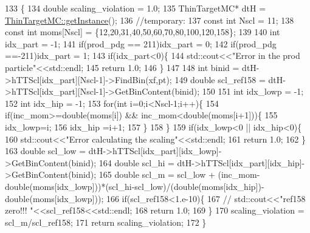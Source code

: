 \begin{DoxyCode}
133                                                                                                            
                \{
134     \textcolor{keywordtype}{double} scaling\_violation = 1.0;
135     ThinTargetMC*  dtH =  \hyperlink{class_neutrino_flux_reweight_1_1_thin_target_m_c_a2a114747fed2677cd3b7213555c002b9}{ThinTargetMC::getInstance}();
136     \textcolor{comment}{//temporary:}
137     \textcolor{keyword}{const} \textcolor{keywordtype}{int} Nscl = 11;
138     \textcolor{keyword}{const} \textcolor{keywordtype}{int} moms[Nscl] = \{12,20,31,40,50,60,70,80,100,120,158\};
139     
140     \textcolor{keywordtype}{int} idx\_part = -1;
141     \textcolor{keywordflow}{if}(prod\_pdg == 211)idx\_part = 0;
142     \textcolor{keywordflow}{if}(prod\_pdg ==-211)idx\_part = 1;
143     \textcolor{keywordflow}{if}(idx\_part<0)\{
144       std::cout<<\textcolor{stringliteral}{"Error in the prod particle"}<<std::endl;
145       \textcolor{keywordflow}{return} 1.0;
146     \}
147     
148     \textcolor{keywordtype}{int} binid = dtH->hTTScl[idx\_part][Nscl-1]->FindBin(xf,pt);
149     \textcolor{keywordtype}{double} scl\_ref158 = dtH->hTTScl[idx\_part][Nscl-1]->GetBinContent(binid);    
150     
151     \textcolor{keywordtype}{int} idx\_lowp = -1;
152     \textcolor{keywordtype}{int} idx\_hip  = -1;
153     \textcolor{keywordflow}{for}(\textcolor{keywordtype}{int} i=0;i<Nscl-1;i++)\{
154       \textcolor{keywordflow}{if}(inc\_mom>=\textcolor{keywordtype}{double}(moms[i]) && inc\_mom<\textcolor{keywordtype}{double}(moms[i+1]))\{
155         idx\_lowp=i;
156         idx\_hip =i+1;
157       \}
158     \}
159     \textcolor{keywordflow}{if}(idx\_lowp<0 || idx\_hip<0)\{
160       std::cout<<\textcolor{stringliteral}{"Error calculating the scaling"}<<std::endl;
161       \textcolor{keywordflow}{return} 1.0;
162     \}
163     \textcolor{keywordtype}{double} scl\_low = dtH->hTTScl[idx\_part][idx\_lowp]->GetBinContent(binid);
164     \textcolor{keywordtype}{double} scl\_hi  = dtH->hTTScl[idx\_part][idx\_hip]->GetBinContent(binid);
165     \textcolor{keywordtype}{double} scl\_m   =  scl\_low + (inc\_mom-double(moms[idx\_lowp]))*(scl\_hi-scl\_low)/(double(moms[idx\_hip])-
      double(moms[idx\_lowp]));
166     \textcolor{keywordflow}{if}(scl\_ref158<1.e-10)\{
167       \textcolor{comment}{// std::cout<<"ref158 zero!!! "<<scl\_ref158<<std::endl;}
168       \textcolor{keywordflow}{return} 1.0;
169     \}
170     scaling\_violation = scl\_m/scl\_ref158;
171     \textcolor{keywordflow}{return} scaling\_violation;
172   \}
\end{DoxyCode}
